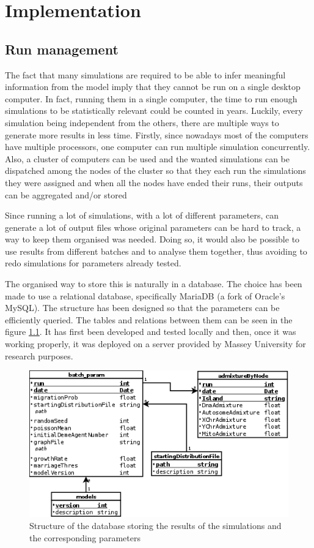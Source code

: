 \documentclass[a4paper,12pt]{report}
\begin{document}
\chapter{Implementation}

\section{Run management}
The fact that many simulations are required to be able to infer meaningful information from the model imply that they cannot be run on a single desktop computer. In fact, running them in a single computer, the time to run enough simulations to be statistically relevant could be counted in years.
Luckily, every simulation being independent from the others, there are multiple ways to generate more results in less time.
Firstly, since nowadays most of the computers have multiple processors, one computer can run multiple simulation concurrently. Also, a cluster of computers can be used and the wanted simulations can be dispatched among the nodes of the cluster so that they each run the simulations they were assigned and when all the nodes have ended their runs, their outputs can be aggregated and/or stored

Since running a lot of simulations, with a lot of different parameters, can generate a lot of output files whose original parameters can be hard to track, a way to keep them organised was needed. Doing so, it would also be possible to use results from different batches and to analyse them together, thus avoiding to redo simulations for parameters already tested.

The organised way to store this is naturally in a database. The choice has been made to use a relational database, specifically MariaDB (a fork of Oracle's MySQL). The structure has been designed so that the parameters can be efficiently queried. The tables and relations between them can be seen in the figure \ref{db}. It has first been developed and tested locally and then, once it was working properly, it was deployed on a server provided by Massey University for research purposes.

\begin{figure}
	\centering
	\includegraphics[scale=0.7]{data/DB.png}
	\caption{Structure of the database storing the results of the simulations and the corresponding parameters}
	\label{db}
\end{figure}
\end{document}
